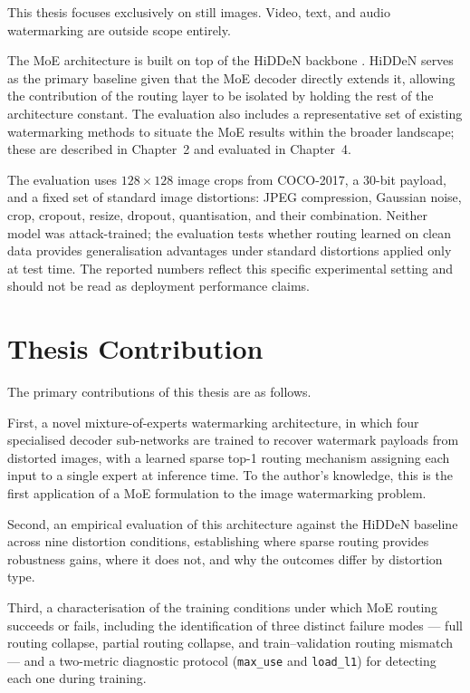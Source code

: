 ﻿\documentclass[12pt, a4paper, twoside]{report}
\numberwithin{equation}{chapter}
\begin{document}
This thesis focuses exclusively on still images. Video, text, and audio watermarking are outside scope entirely.
 
The MoE architecture is built on top of the HiDDeN backbone \cite{zhu2018}. HiDDeN serves as the primary baseline given that the MoE decoder directly extends it, allowing the contribution of the routing layer to be isolated by holding the rest of the architecture constant. The evaluation also includes a representative set of existing watermarking methods to situate the MoE results within the broader landscape; these are described in Chapter~2 and evaluated in Chapter~4.
 
The evaluation uses $128 \times 128$ image crops from COCO-2017, a 30-bit payload, and a fixed set of standard image distortions: JPEG compression, Gaussian noise, crop, cropout, resize, dropout, quantisation, and their combination. Neither model was attack-trained; the evaluation tests whether routing learned on clean data provides generalisation advantages under standard distortions applied only at test time. The reported numbers reflect this specific experimental setting and should not be read as deployment performance claims.
 
\section{Thesis Contribution}
 
The primary contributions of this thesis are as follows.
 
First, a novel mixture-of-experts watermarking architecture, in which four specialised decoder sub-networks are trained to recover watermark payloads from distorted images, with a learned sparse top-1 routing mechanism assigning each input to a single expert at inference time. To the author's knowledge, this is the first application of a MoE formulation to the image watermarking problem.
 
Second, an empirical evaluation of this architecture against the HiDDeN baseline across nine distortion conditions, establishing where sparse routing provides robustness gains, where it does not, and why the outcomes differ by distortion type.
 
Third, a characterisation of the training conditions under which MoE routing succeeds or fails, including the identification of three distinct failure modes --- full routing collapse, partial routing collapse, and train--validation routing mismatch --- and a two-metric diagnostic protocol (\texttt{max\_use} and \texttt{load\_l1}) for detecting each one during training.
 
\end{document}
